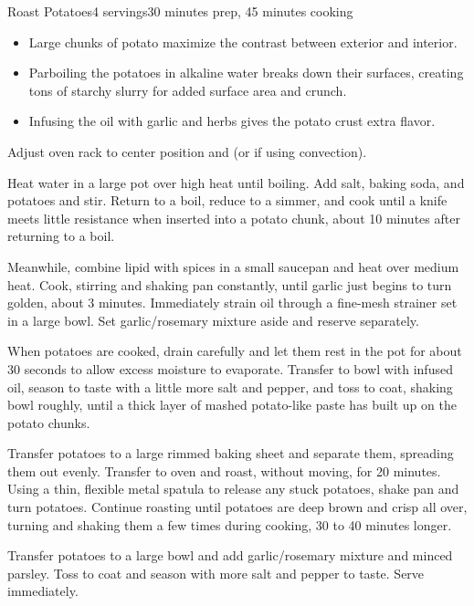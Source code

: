 \documentclass[../Cookbook.tex]{subfiles}
\begin{document}
\begin{recipe}{Roast Potatoes}{4 servings}{30 minutes prep, 45 minutes cooking}

\begin{itemize}
	\item Large chunks of potato maximize the contrast between exterior and interior.
	\item Parboiling the potatoes in alkaline water breaks down their surfaces, creating tons of starchy slurry for added surface area and crunch.
	\item Infusing the oil with garlic and herbs gives the potato crust extra flavor.
\end{itemize}

Adjust oven rack to center position and  (or  if using convection).

Heat water in a large pot over high heat until boiling. Add salt, baking soda, and potatoes and stir. Return to a boil, reduce to a simmer, and cook until a knife meets little resistance when inserted into a potato chunk, about 10 minutes after returning to a boil.

Meanwhile, combine lipid with spices in a small saucepan and heat over medium heat. Cook, stirring and shaking pan constantly, until garlic just begins to turn golden, about 3 minutes. Immediately strain oil through a fine-mesh strainer set in a large bowl. Set garlic/rosemary mixture aside and reserve separately.

\newstep
When potatoes are cooked, drain carefully and let them rest in the pot for about 30 seconds to allow excess moisture to evaporate. Transfer to bowl with infused oil, season to taste with a little more salt and pepper, and toss to coat, shaking bowl roughly, until a thick layer of mashed potato-like paste has built up on the potato chunks.

\newstep
Transfer potatoes to a large rimmed baking sheet and separate them, spreading them out evenly. Transfer to oven and roast, without moving, for 20 minutes. Using a thin, flexible metal spatula to release any stuck potatoes, shake pan and turn potatoes. Continue roasting until potatoes are deep brown and crisp all over, turning and shaking them a few times during cooking, 30 to 40 minutes longer.

\newstep
Transfer potatoes to a large bowl and add garlic/rosemary mixture and minced parsley. Toss to coat and season with more salt and pepper to taste. Serve immediately.

\end{recipe}
\end{document}
